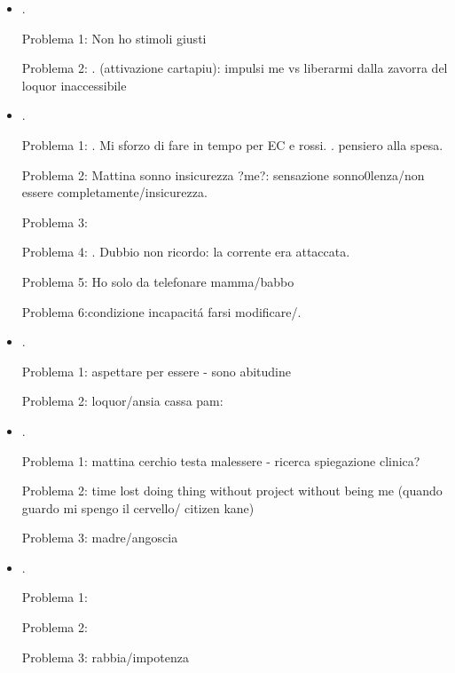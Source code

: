 \begin{itemize}
\item {}.

Problema 1: Non ho stimoli giusti 

Problema 2: . (attivazione cartapiu): impulsi me vs liberarmi dalla zavorra del loquor inaccessibile


\item {}.

Problema 1: . Mi sforzo di fare in tempo per EC e rossi. . pensiero alla spesa.

Problema 2: Mattina sonno insicurezza ?me?: sensazione sonno0lenza/non essere completamente/insicurezza.

Problema 3: 

Problema 4: . Dubbio non ricordo: la corrente era attaccata.

Problema 5: Ho solo da telefonare mamma/babbo

Problema 6:condizione incapacit\'a farsi modificare/.


\item {}.

Problema 1: aspettare per essere - sono abitudine

Problema 2: loquor/ansia cassa pam: 


\item {}.

Problema 1: mattina cerchio testa malessere - ricerca spiegazione clinica?

Problema 2: time lost doing thing without project without being me (quando guardo mi spengo il cervello/ citizen kane)

Problema 3: madre/angoscia


\item {}.

Problema 1: 

Problema 2: 

Problema 3: rabbia/impotenza



\end{itemize}
